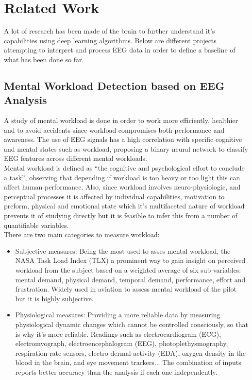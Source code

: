 \section{Related Work}
\label{sec-related-work}
A lot of research has been made of the brain to further understand it’s capabilities using deep learning algorithms. Below are different projects attempting to interpret and process EEG data in order to define a baseline of what has been done so far. 
\\
\subsection{Mental Workload Detection based on EEG Analysis}
\label{subsec-work1}
A study of mental workload is done in order to work more efficiently, healthier and to avoid accidents since workload compromises both performance and awareness. The use of EEG signals has a high correlation with specific cognitive and mental states such as workload, proposing a binary neural network to classify EEG features across different mental workloads.
\\
Mental workload is defined as “the cognitive and psychological effort to conclude a task”, observing that depending if workload is too heavy or too light this can affect human performance. Also, since workload involves neuro-physiologic, and perceptual processes it is affected by individual capabilities, motivation to preform, physical and emotional state which it’s multifaceted nature of workload prevents it of studying directly but it is feasible to infer this from a number of quantifiable variables.
\\
There are two main categories to measure workload:
\\
\begin{itemize}
\item Subjective measures: Being the most used to asses mental workload, the NASA Task Load Index (TLX) a prominent way to gain insight on perceived workload from the subject based on a weighted average of six sub-variables: mental demand, physical demand, temporal demand, performance, effort and frustration. Widely used in aviation to assess mental workload of the pilot but it is highly subjective.
\item Physiological measures: Providing a more reliable data by measuring physiological dynamic changes which cannot be controlled consciously, so that is why it’s more reliable. Readings such as electrocardiogram (ECG), electromyograph, electroencephalogram (EEG), photoplethysmography, respiration rate sensors, electro-dermal activity (EDA), oxygen density in the blood in the brain, and eye movement trackers... The combination of inputs reports better accuracy than the analysis if each one independently.
\end{itemize}
